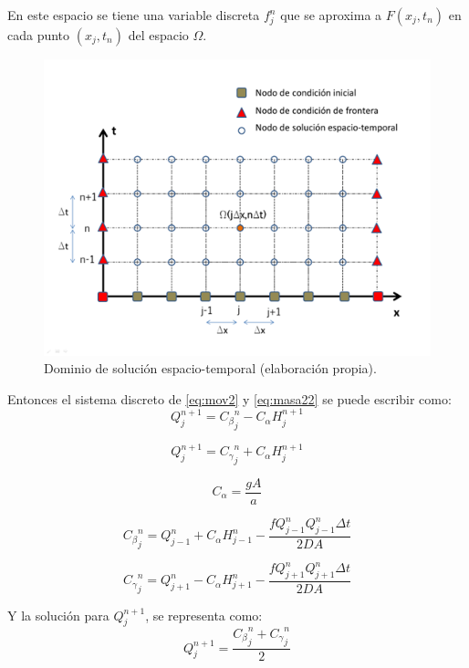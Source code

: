 \documentclass[letterpaper]{report}
\begin{document}
En este espacio se tiene una variable discreta $f_j^n$ que se aproxima a $F(x_j,t_n)$ en cada punto $(x_j,t_n)$  del espacio $\Omega$.
\begin{figure}[H]
	\centering
	\includegraphics[width=0.8\linewidth]{figuras/fig29}
	\caption{Dominio de solución espacio-temporal (elaboración propia).}
	\label{fig:fig29}
\end{figure}

Entonces el sistema discreto de \ref{eq:mov2} y \ref{eq:masa22}  se puede escribir como:
\begin{equation}
	Q_j^{n+1}={C_\beta}_j^n-C_\alpha H_j^{n+1}
\end{equation}

\begin{equation}
	Q_j^{n+1}={C_\gamma}_j^n+C_\alpha H_j^{n+1}
\end{equation}

\begin{equation}
	C_\alpha=\frac{gA}{a}
\end{equation}

\begin{equation}
	{C_\beta}_j^n=Q_{j-1}^n+C_\alpha H_{j-1}^n-\dfrac{fQ_{j-1}^n Q_{j-1}^n\Delta t}{2DA}
\end{equation}

\begin{equation}
	{C_\gamma}_j^n=Q_{j+1}^n-C_\alpha H_{j+1}^n-\dfrac{fQ_{j+1}^nQ_{j+1}^n \Delta t}{2DA}
\end{equation}

Y la solución para $Q_j^{n+1}$, se representa como:
\begin{equation}
	Q_j^{n+1}=\dfrac{{C_\beta}_j^n+{C_\gamma}_j^n}{2}
\end{equation}
\end{document}
